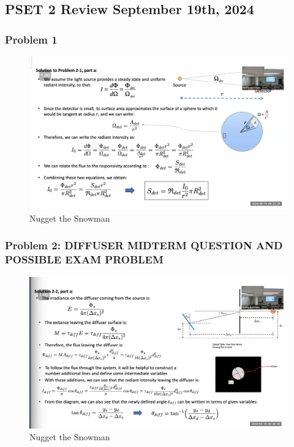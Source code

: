 \documentclass{article}
\begin{document}
\subsection{PSET 2 Review September 19th, 2024}

\subsubsection{Problem 1}
\begin{figure}[h!]
\centering
\includegraphics[scale=.6]{Radiometry/Week4/Notes/PSET2/P1.png}
\caption{Nugget the Snowman}
\label{fig:P1}
\end{figure}
\subsubsection{Problem 2: DIFFUSER MIDTERM QUESTION AND POSSIBLE EXAM PROBLEM
}

\begin{figure}[h!]
\centering
\includegraphics[scale=.6]{Radiometry/Week4/Notes/PSET2/P2.png}
\caption{Nugget the Snowman}
\label{fig:P2}
\end{figure}
\end{document}
